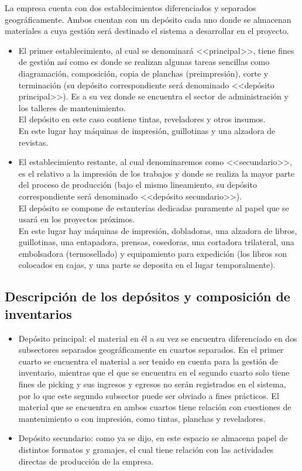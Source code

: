 \documentclass[a4paper, 12pt,twoside]{report}  %
\numberwithin{equation}{subsection} %
\begin{document}
La empresa cuenta con dos establecimientos diferenciados y separados geográficamente. Ambos cuentan con un depósito cada uno donde se almacenan materiales a cuya gestión será destinado el sistema a desarrollar en el proyecto.
\begin{itemize}
\item El primer establecimiento, al cual se denominará <<principal>>, tiene fines de gestión así como es donde se realizan algunas tareas sencillas como diagramación, composición, copia de planchas (preimpresión), corte y terminación (su depósito correspondiente será denominado <<depósito principal>>). Es a su vez donde se encuentra el sector de administración y los talleres de mantenimiento.\\
El depósito en este caso contiene tintas, reveladores y otros insumos.\\
En este lugar hay máquinas de impresión, guillotinas y una alzadora de revistas.
\item El establecimiento restante, al cual denominaremos como <<secundario>>, es el relativo a la impresión de los trabajos y donde se realiza la mayor parte del proceso de producción (bajo el mismo lineamiento, su depósito correspondiente será denominado <<depósito secundario>>).\\
El depósito se compone de estanterías dedicadas puramente al papel que se usará en los proyectos próximos.\\
En este lugar hay máquinas de impresión, dobladoras, una alzadora de libros, guillotinas, una entapadora, prensas, cosedoras, una cortadora trilateral, una embolsadora (termosellado) y equipamiento para expedición (los libros son colocados en cajas, y una parte se deposita en el lugar temporalmente).
\end{itemize}

 \subsection{Descripción de los depósitos y composición de inventarios}

 \begin{itemize}
 \item Depósito principal: el material en él a su vez se encuentra diferenciado en dos subsectores separados geográficamente en cuartos separados. En el primer cuarto se encuentra el material a ser tenido en cuenta para la gestión de inventario, mientras que el que se encuentra en el segundo cuarto solo tiene fines de picking y sus ingresos y egresos no serán registrados en el sistema, por lo que este segundo subsector puede ser obviado a fines prácticos. El material que se encuentra en ambos cuartos tiene relación con cuestiones de mantenimiento o con impresión, como tintas, planchas y reveladores.
\item Depósito secundario: como ya se dijo, en este espacio se almacena papel de distintos formatos y gramajes, el cual tiene relación con las actividades directas de producción de la empresa.
 \end{itemize}
\end{document}
